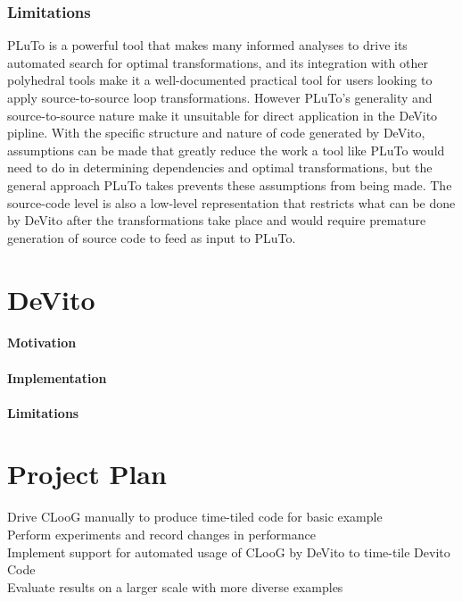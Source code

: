 \documentclass[a4paper,12pt,twoside]{report}
\begin{document}
\subsection{Limitations}
PLuTo is a powerful tool that makes many informed analyses to drive its automated search for optimal transformations, and its integration
with other polyhedral tools make it a well-documented practical tool for users looking to apply source-to-source loop transformations. However
PLuTo's generality and source-to-source nature make it unsuitable for direct application in the DeVito pipline. With the specific structure and
nature of code generated by DeVito, assumptions can be made that greatly reduce the work a tool like PLuTo would need to do in determining
dependencies and optimal transformations, but the general approach PLuTo takes prevents these assumptions from being made. The source-code level
is also a low-level representation that restricts what can be done by DeVito after the transformations take place and would require premature
generation of source code to feed as input to PLuTo.

\chapter{DeVito}
\subsubsection{Motivation}
\subsubsection{Implementation}
\subsubsection{Limitations}

\chapter{Project Plan}
Drive CLooG manually to produce time-tiled code for basic example \\
Perform experiments and record changes in performance \\
Implement support for automated usage of CLooG by DeVito to time-tile Devito Code \\
Evaluate results on a larger scale with more diverse examples




\end{document}
